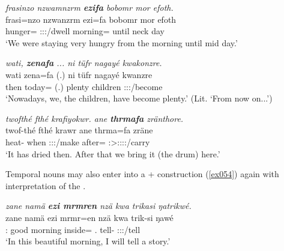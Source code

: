 \begin{exe}
	\ex \emph{frasinzo nzwamnzrm \textbf{ezifa} bobomr mor efoth.}\\
	\gll frasi=nzo nzwanzrm ezi=fa bobomr mor efoth\\
	hunger=\Only{} \Fpl:\Sbj:\Pst:\Dur/dwell morning=\Abl{} until neck day\\
	\trans `We were staying very hungry from the morning until mid day.'\\
	\label{ex053}
\end{exe}
\begin{exe}
	\ex \emph{wati, \textbf{zenafa} ... ni tüfr nagayé kwakonzre.}\\
	\gll wati zena=fa (.) ni tüfr nagayé kwanzre\\
	then today=\Abl{} (.) \Fnsg{} plenty children \Fpl:\Sbj:\Rpst:\Ipfv/become\\
	\trans `Nowadays, we, the children, have become plenty.' (Lit. `From now on...')\\
	\label{ex056}
\end{exe}
\begin{exe}
	\ex \emph{twofthé fthé krafiyokwr. ane \textbf{thrmafa} zränthore.}\\
	\gll twof-thé fthé krawr ane thrma=fa zräne\\
	heat-\Adlzr{} when \Stsg:\Sbj:\Irr:\Ipfv/make \Dem{} after=\Abl{} \Fpl:\Sbj>\Tsg:\F:\Irr:\Pfv:\Venit/carry\\
	\trans `It has dried then. After that we bring it (the drum) here.'\\
	\label{ex059}
\end{exe}

Temporal nouns may also enter into a + construction (\ref{ex054}) again with  interpretation of the .

\begin{exe}
	\ex \emph{zane namä \textbf{ezi mrmren} nzä kwa trikasi ŋatrikwé.}\\
	\gll zane namä ezi mrmr=en nzä kwa trik-si ŋawé\\
	\Dem{}:\Prox{} good morning inside=\Loc{} \Fsg{}.\Abs{} \Fut{} tell-\Nmlz{} \Fsg{}:\Sbj:\Nonpast:\Ipfv/tell\\
	\trans `In this beautiful morning, I will tell a story.'
	\label{ex054}
\end{exe}

